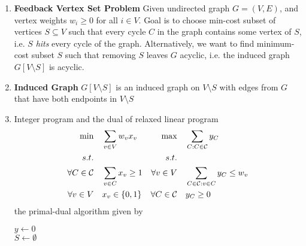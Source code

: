 \documentclass[11pt]{article}
\begin{document}
\begin{enumerate}
    \item \textbf{Feedback Vertex Set Problem} Given undirected graph $G=(V,E)$, and vertex weights $w_{i}\geq 0$ for all $i\in V$. Goal is to choose min-cost subset of vertices $S\subseteq V$ such that every cycle $C$ in the graph contains some vertex of $S$, i.e. $S$ \textit{hits} every cycle of the graph. Alternatively, we want to find minimum-cost subset $S$ such that removing $S$ leaves $G$ acyclic, i.e. the induced graph $G[V\setminus S]$ is acyclic.
    \item \textbf{Induced Graph} $G[V\setminus S]$ is an induced graph on $V\setminus S$ with edges from $G$ that have both endpoints in $V\setminus S$
    \item Integer program and the dual of relaxed linear program
    \begin{align*}
        \min \quad & \sum_{v\in V} w_v x_v 
        & 
        \max \quad & \sum_{C:C\in\mathcal{C}} y_C 
        \\
        s.t. \quad & 
        &
        s.t. \quad &
        \\
        \forall C\in \mathcal{C} \quad & \sum_{v\in C}x_v \geq 1 
        &
        \forall v\in V \quad & \sum_{C\in\mathcal{C}: v\in C} y_C \leq w_v
        \\
        \forall v\in V \quad & x_v \in \{0,1\} 
        &
        \forall C\in\mathcal{C} \quad & y_C\geq 0
        \\ 
    \end{align*}
    the primal-dual algorithm given by \\
    \begin{algorithm}[H]
        $y\leftarrow 0$ \\
        $S\leftarrow \emptyset$ \\

\end{algorithm}
\end{enumerate}
\end{document}
